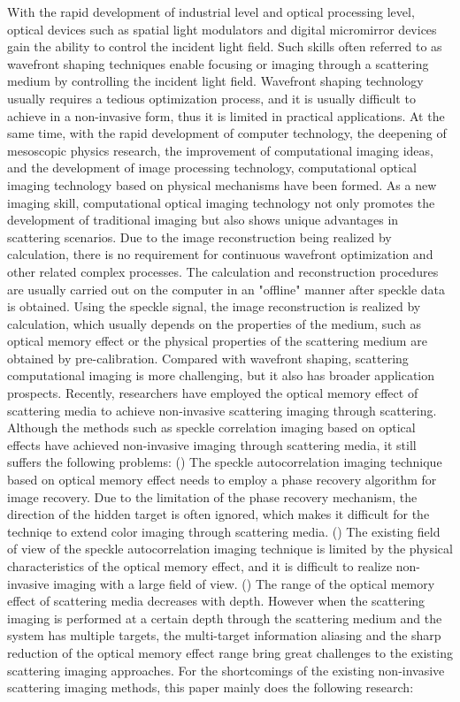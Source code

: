 \begin{englishabstract}
With the rapid development of industrial level and optical processing level,  optical devices such as spatial light modulators and digital micromirror devices gain the ability to control the incident light field. Such skills often referred to as wavefront shaping techniques enable focusing or imaging through a scattering medium by controlling the incident light field. Wavefront shaping technology usually requires a tedious optimization process, and it is usually difficult to achieve in a non-invasive form, thus it is limited in practical applications. At the same time, with the rapid development of computer technology, the deepening of mesoscopic physics research, the improvement of computational imaging ideas, and the development of image processing technology, computational optical imaging technology based on physical mechanisms have been formed. As a new imaging skill, computational optical imaging technology not only promotes the development of traditional imaging but also shows unique advantages in scattering scenarios. Due to the image reconstruction being realized by calculation, there is no requirement for continuous wavefront optimization and other related complex processes. The calculation and reconstruction procedures are usually carried out on the computer in an "offline" manner after speckle data is obtained. Using the speckle signal, the image reconstruction is realized by calculation, which usually depends on the properties of the medium, such as optical memory effect or the physical properties of the scattering medium are obtained by pre-calibration. Compared with wavefront shaping, scattering computational imaging is more challenging, but it also has broader application prospects. Recently, researchers have employed the optical memory effect of scattering media to achieve non-invasive scattering imaging through scattering. Although the methods such as speckle correlation imaging based on optical effects have achieved non-invasive imaging through scattering media, it still suffers the following problems: () The speckle autocorrelation imaging technique based on optical memory effect needs to employ a phase recovery algorithm for image recovery. Due to the limitation of the phase recovery mechanism, the direction of the hidden target is often ignored, which makes it difficult for the techniqe to extend color imaging through scattering media. () The existing field of view of the speckle autocorrelation imaging technique is limited by the physical characteristics of the optical memory effect, and it is difficult to realize non-invasive imaging with a large field of view. () The range of the optical memory effect of scattering media decreases with depth. However when the scattering imaging is performed at a certain depth through the scattering medium and the system has multiple targets, the multi-target information aliasing and the sharp reduction of the optical memory effect range bring great challenges to the existing scattering imaging approaches. For the shortcomings of the existing non-invasive scattering imaging methods, this paper mainly does the following research:


\end{englishabstract}

